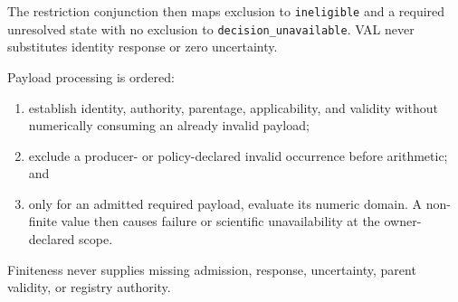 The restriction conjunction then maps exclusion to \texttt{ineligible} and a
required unresolved state with no exclusion to
\texttt{decision\_unavailable}. VAL never substitutes identity response or
zero uncertainty.

Payload processing is ordered:
\begin{enumerate}
  \item establish identity, authority, parentage, applicability, and validity
        without numerically consuming an already invalid payload;
  \item exclude a producer- or policy-declared invalid occurrence before
        arithmetic; and
  \item only for an admitted required payload, evaluate its numeric domain.
        A non-finite value then causes failure or scientific unavailability at
        the owner-declared scope.
\end{enumerate}
Finiteness never supplies missing admission, response, uncertainty, parent
validity, or registry authority.
